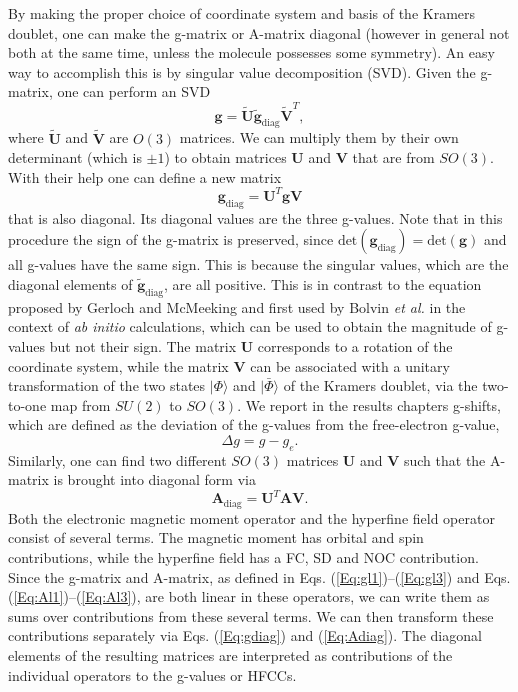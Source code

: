 By making the proper choice of coordinate system and basis of the Kramers doublet, one can make the g-matrix or A-matrix diagonal (however in general not both at the same time, unless the molecule possesses some symmetry). An easy way to accomplish this is by singular value decomposition (SVD).
Given the g-matrix, one can perform an SVD
	\begin{equation}
	{\mathbf{g}} = {\mathbf{\tilde U}}{{\mathbf{\tilde g}}_{{\text{diag}}}}{{\mathbf{\tilde V}}^T},
	\end{equation} 	
where ${\mathbf{\tilde U}}$ and ${\mathbf{\tilde V}}$ are $O(3)$ matrices. We can multiply them by their own determinant (which is $ \pm 1$) to obtain matrices ${\mathbf{U}}$ and ${\mathbf{V}}$ that are from $SO(3)$. With their help one can define a new matrix
	\begin{equation}
	\label{Eq:gdiag}
	{{\mathbf{g}}_{{\text{diag}}}} = {{\mathbf{U}}^T}{\mathbf{gV}}
	\end{equation} 	
that is also diagonal. Its diagonal values are the three g-values. Note that in this procedure the sign of the g-matrix is preserved, since ${\text{det}}({{\mathbf{g}}_{{\text{diag}}}}) = {\text{det}}({\mathbf{g}})$ and all g-values have the same sign. This is because the singular values, which are the diagonal elements of ${{\mathbf{\tilde g}}_{{\text{diag}}}}$, are all positive. This is in contrast to the equation proposed by Gerloch and McMeeking\cite{GerloM_1975_2443} and first used by Bolvin \textit{et al.} in the context of \textit{ab initio} calculations,\cite{Bolvi_2006_1575} which can be used to obtain the magnitude of g-values but not their sign.
The matrix ${\mathbf{U}}$ corresponds to a rotation of the coordinate system, while the matrix ${\mathbf{V}}$ can be associated with a unitary transformation of the two states $|\Phi \rangle $ and $|\bar \Phi \rangle $ of the Kramers doublet, via the two-to-one map from $SU(2)$ to $SO(3)$.\cite{AbragB_2012_} We report in the results chapters g-shifts, which are defined as the deviation of the g-values from the free-electron g-value,
	\begin{equation}
	\Delta g = g - {g_e}.
	\end{equation} 	
Similarly, one can find two different $SO(3)$ matrices ${\mathbf{U}}$ and ${\mathbf{V}}$ such that the A-matrix is brought into diagonal form via
	\begin{equation}
	\label{Eq:Adiag}
	{{\mathbf{A}}_{{\text{diag}}}} = {{\mathbf{U}}^T}{\mathbf{AV}}.
	\end{equation} 	
Both the electronic magnetic moment operator and the hyperfine field operator consist of several terms. The magnetic moment has orbital and spin contributions, while the hyperfine field has a FC, SD and NOC contribution. Since the g-matrix and A-matrix, as defined in Eqs. (\ref{Eq:gl1})--(\ref{Eq:gl3}) and Eqs. (\ref{Eq:Al1})--(\ref{Eq:Al3}), are both linear in these operators, we can write them as sums over contributions from these several terms. We can then transform these contributions separately via Eqs. (\ref{Eq:gdiag}) and (\ref{Eq:Adiag}). The diagonal elements of the resulting matrices are interpreted as contributions of the individual operators to the g-values or HFCCs.

